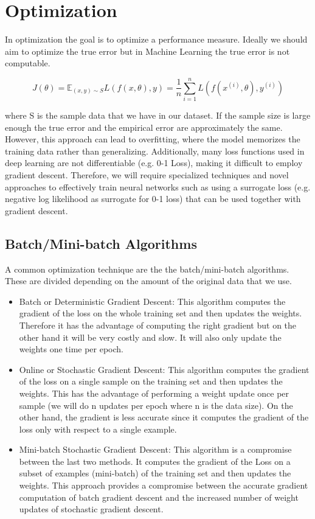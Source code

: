 \chapter{Optimization}

In optimization the goal is to optimize a performance measure. Ideally we should aim to optimize the true error but in Machine Learning the true error is not computable.

$$J(\theta) = \mathbb{E}_{(x, y) \sim S} L(f(x, \theta), y) = \frac{1}{n} \sum_{i=1}^{n} L(f(x^{(i)}, \theta), y^{(i)})$$

where S is the sample data that we have in our dataset. If the sample size is large enough the true error and the empirical error are approximately the same. However, this approach can lead to overfitting, where the model memorizes the training data rather than generalizing. Additionally, many loss functions used in deep learning are not differentiable (e.g. 0-1 Loss), making it difficult to employ gradient descent. Therefore, we will require specialized techniques and novel approaches to effectively train neural networks such as using a surrogate loss (e.g. negative log likelihood as surrogate for 0-1 loss) that can be used together with gradient descent.

\section{Batch/Mini-batch Algorithms}

A common optimization technique are the the batch/mini-batch algorithms. These are divided depending on the amount of the original data that we use.

\begin{itemize}
    \item Batch or Deterministic Gradient Descent: This algorithm computes the gradient of the loss on the whole training set and then updates the weights. Therefore it has the advantage of computing the right gradient but on the other hand it will be very costly and slow. It will also only update the weights one time per epoch.
    \item Online or Stochastic Gradient Descent: This algorithm computes the gradient of the loss on a single sample on the training set and then updates the weights. This has the advantage of performing a weight update once per sample (we will do n updates per epoch where n is the data size). On the other hand, the gradient is less accurate since it computes the gradient of the loss only with respect to a single example.
    \item Mini-batch Stochastic Gradient Descent: This algorithm is a compromise between the last two methods. It computes the gradient of the Loss on a subset of examples (mini-batch) of the training set and then updates the weights. This approach provides a compromise between the accurate gradient computation of batch gradient descent and the increased number of weight updates of stochastic gradient descent.    
\end{itemize}

